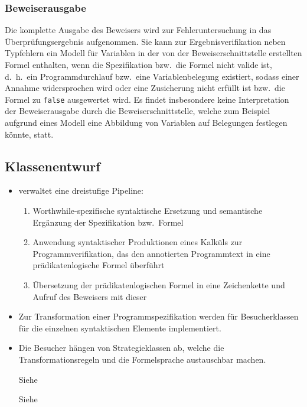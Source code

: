 \subsubsection{Beweiserausgabe}%

Die komplette Ausgabe des Beweisers wird zur Fehleruntersuchung in das
Überprüfungsergebnis aufgenommen. Sie kann zur Ergebnisverifikation
neben Typfehlern ein Modell für Variablen in der von der
Beweiserschnittstelle erstellten Formel enthalten, wenn die
Spezifikation bzw.\ die Formel nicht valide ist, d.~h.\ ein
Programmdurchlauf bzw.\ eine Variablenbelegung existiert, sodass einer
Annahme widersprochen wird oder eine Zusicherung nicht erfüllt ist
bzw.\ die Formel zu \texttt{false} ausgewertet wird. Es findet
insbesondere keine Interpretation der Beweiserausgabe durch die
Beweiserschnittstelle, welche zum Beispiel aufgrund eines Modell eine
Abbildung von Variablen auf Belegungen festlegen könnte, statt.%

\subsection{Klassenentwurf}%

\begin{itemize}%

    \item {} verwaltet eine dreistufige
    Pipeline:%

        \begin{enumerate}%
            \item Worthwhile-spezifische syntaktische Ersetzung und
            semantische Ergänzung der Spezifikation bzw.\ Formel%

            \item Anwendung syntaktischer Produktionen eines Kalküls
            zur Programmverifikation, das den annotierten
            Programmtext in eine prädikatenlogische Formel überführt%

            \item Übersetzung der prädikatenlogischen Formel in eine
            Zeichenkette und Aufruf des Beweisers mit dieser%

        \end{enumerate}%

    \item Zur Transformation einer Programmspezifikation werden für
     Besucherklassen für die einzelnen syntaktischen
    Elemente implementiert.%

    \item Die Besucher hängen von Strategieklassen ab, welche die
    Transformationsregeln und die Formelsprache austauschbar machen.%

    Siehe %

    Siehe %


\end{itemize}%

